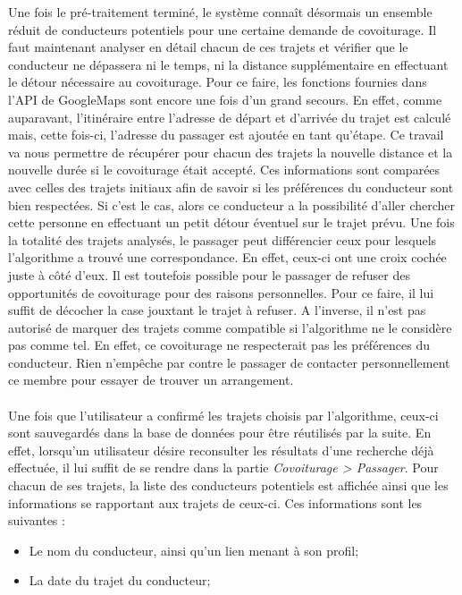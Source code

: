 \documentclass[12pt, a4paper, oneside]{article}
\begin{document}
{{     \indent Une fois le pré-traitement terminé, le système connaît désormais un ensemble réduit de conducteurs potentiels pour une certaine demande de covoiturage. Il faut maintenant analyser en détail chacun de ces trajets et vérifier que le conducteur ne dépassera ni le temps, ni la distance supplémentaire en effectuant le détour nécessaire au covoiturage. Pour ce faire, les fonctions fournies dans l'API de GoogleMaps sont encore une fois d'un grand secours. En effet, comme auparavant, l'itinéraire entre l'adresse de départ et d'arrivée du trajet est calculé mais, cette fois-ci, l'adresse du passager est ajoutée en tant qu'étape. Ce travail va nous permettre de récupérer pour chacun des trajets la nouvelle distance et la nouvelle durée si le covoiturage était accepté. Ces informations sont comparées avec celles des trajets initiaux afin de savoir si les préférences du conducteur sont bien respectées. Si c'est le cas, alors ce conducteur a la possibilité d'aller chercher cette personne en effectuant un petit détour éventuel sur le trajet prévu. Une fois la totalité des trajets analysés, le passager peut différencier ceux pour lesquels l'algorithme a trouvé une correspondance. En effet, ceux-ci ont une croix cochée juste à côté d'eux. Il est toutefois possible pour le passager de refuser des opportunités de covoiturage pour des raisons personnelles. Pour ce faire, il lui suffit de décocher la case jouxtant le trajet à refuser. A l'inverse, il n'est pas autorisé de marquer des trajets comme compatible si l'algorithme ne le considère pas comme tel. En effet, ce covoiturage ne respecterait pas les préférences du conducteur. Rien n'empêche par contre le passager de contacter personnellement ce membre pour essayer de trouver un arrangement.\\\\
     \indent Une fois que l'utilisateur a confirmé les trajets choisis par l'algorithme, ceux-ci sont sauvegardés dans la base de données pour être réutilisés par la suite. En effet, lorsqu'un utilisateur désire reconsulter les résultats d'une recherche déjà effectuée, il lui suffit de se rendre dans la partie \textit{Covoiturage > Passager}. Pour chacun de ses trajets, la liste des conducteurs potentiels est affichée ainsi que les informations se rapportant aux trajets de ceux-ci. Ces informations sont les suivantes :
     \begin{itemize}
        \item Le nom du conducteur, ainsi qu'un lien menant à son profil;
        \item La date du trajet du conducteur;

\end{itemize}}}
\end{document}
